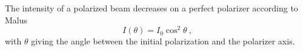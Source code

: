 The intensity of a polarized beam decreases on a perfect polarizer according to Malus
\begin{equation}
	I(\theta) = I_0 \cos^2\theta \: ,
	\label{eqn:pol}
\end{equation}
with $\theta$ giving the angle between the initial polarization and the polarizer axis.



